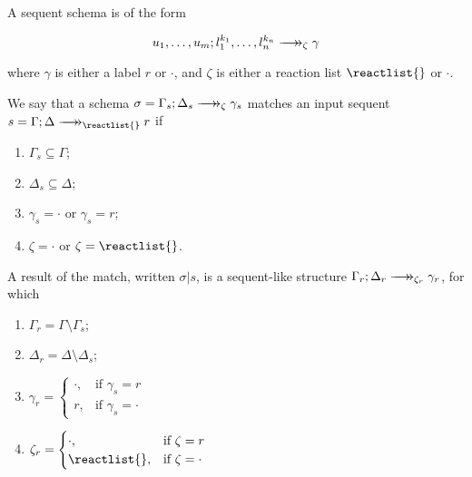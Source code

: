 \begin{definition}
  A sequent schema is of the form

  \[
    u_1, \dots, u_m ; l_1^{k_1}, \dots, l_n^{k_n} \fneuseqsymb_{\zeta} \gamma
  \]

  where $\gamma$ is either a label $r$ or $\cdot$, and $\zeta$ is either a
  reaction list $\reactlist{}$ or $\cdot$.
\end{definition}

\begin{definition}[Matching]
  We say that a schema $\sigma = \zfneuseq{\Gamma_s}{\Delta_s}{\zeta}{\gamma_s}$ matches
  an input sequent $s = \zfneuseq{\Gamma}{\Delta}{\reactlist{}}{r}$ if

  \begin{enumerate}
  \item $\Gamma_s \subseteq \Gamma$;
  \item $\Delta_s \subseteq \Delta$;
  \item $\gamma_s = \cdot$ or $\gamma_s = r$;
  \item $\zeta = \cdot$ or $\zeta = \reactlist{}$.
  \end{enumerate}
\end{definition}
\begin{definition}
  A result of the match, written $\sigma | s$, is a sequent-like structure
  $\zfneuseq{\Gamma_r}{\Delta_r}{\zeta_r}{\gamma_r}$, for which

  \begin{enumerate}
  \item $\Gamma_r = \Gamma \setminus \Gamma_s$;
  \item $\Delta_r = \Delta \setminus \Delta_s$;
  \item $\gamma_r =
    \begin{cases}
      \cdot, & \text{if } \gamma_s = r \\
      r,     & \text{if } \gamma_s = \cdot
    \end{cases}$
  \item $\zeta_r =
    \begin{cases}
      \cdot, & \text{if } \zeta = r \\
      \reactlist{},     & \text{if } \zeta = \cdot
    \end{cases}$
  \end{enumerate}
\end{definition}

